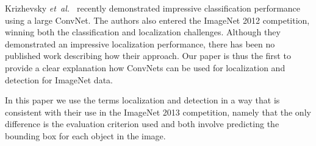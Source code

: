 \documentclass{article} %
\def\etal{{\textit{et~al.~}}}
\begin{document}
Krizhevsky \etal \cite{Kriz12} recently demonstrated impressive
classification performance using a large ConvNet. The authors also
entered the ImageNet 2012 competition, winning both the
classification and localization challenges. Although they demonstrated
an impressive localization performance, there has been no published
work describing how their approach. Our paper is thus the first to
provide a clear explanation how ConvNets can be used for localization
and detection for ImageNet data.

In this paper we use the terms localization and detection in a way
that is consistent with their use in the ImageNet 2013 competition,
namely that the only difference is the evaluation criterion used and both
involve predicting the bounding box for each object in the image. 




\end{document}
